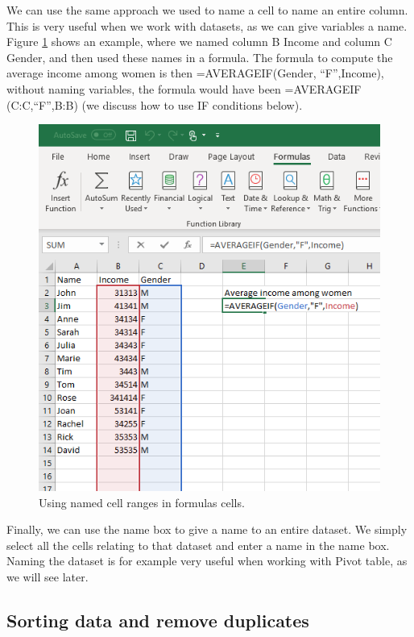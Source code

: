 \documentclass[]{book}
\begin{document}
We can use the same approach we used to name a cell to name an entire column. This is very useful when we work with datasets, as we can give variables a name. Figure \ref{fig:advex11} shows an example, where we named column B Income and column C Gender, and then used these names in a formula. The formula to compute the average income among women is then =AVERAGEIF(Gender, ``F'',Income), without naming variables, the formula would have been =AVERAGEIF (C:C,``F'',B:B) (we discuss how to use IF conditions below).

\begin{figure}

{\centering \includegraphics[width=0.8\linewidth]{_resources/chapter_advexc/3} 

}

\caption{Using named cell ranges in formulas cells.}\label{fig:advex11}
\end{figure}

Finally, we can use the name box to give a name to an entire dataset. We simply select all the cells relating to that dataset and enter a name in the name box. Naming the dataset is for example very useful when working with Pivot table, as we will see later.

\hypertarget{sorting-data-and-remove-duplicates}{%
\subsection{Sorting data and remove duplicates}\label{sorting-data-and-remove-duplicates}}
\end{document}
